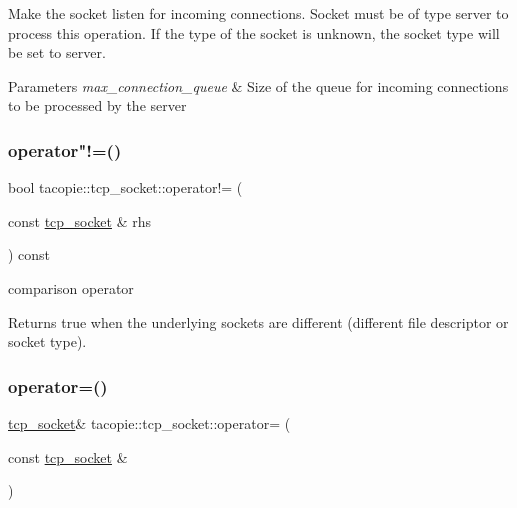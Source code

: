 Make the socket listen for incoming connections. Socket must be of type server to process this operation. If the type of the socket is unknown, the socket type will be set to server.


\begin{DoxyParams}{Parameters}
{\em max\+\_\+connection\+\_\+queue} & Size of the queue for incoming connections to be processed by the server \\
\hline
\end{DoxyParams}
\mbox{\label{classtacopie_1_1tcp__socket_a76f69612969374b5aa542378d37ee398}} 
\subsubsection{\texorpdfstring{operator"!=()}{operator!=()}}
{\footnotesize\ttfamily bool tacopie\+::tcp\+\_\+socket\+::operator!= (\begin{DoxyParamCaption}\item[{const \hyperlink{classtacopie_1_1tcp__socket}{tcp\+\_\+socket} \&}]{rhs }\end{DoxyParamCaption}) const}

comparison operator

\begin{DoxyReturn}{Returns}
true when the underlying sockets are different (different file descriptor or socket type). 
\end{DoxyReturn}
\mbox{\label{classtacopie_1_1tcp__socket_aae3234c92bd36d5a614e44472d42bbf4}} 
\subsubsection{\texorpdfstring{operator=()}{operator=()}}
{\footnotesize\ttfamily \hyperlink{classtacopie_1_1tcp__socket}{tcp\+\_\+socket}\& tacopie\+::tcp\+\_\+socket\+::operator= (\begin{DoxyParamCaption}\item[{const \hyperlink{classtacopie_1_1tcp__socket}{tcp\+\_\+socket} \&}]{ }\end{DoxyParamCaption})\hspace{0.3cm}{\ttfamily [delete]}}



